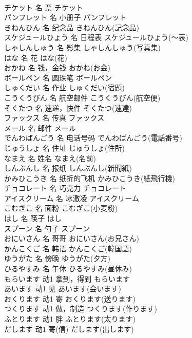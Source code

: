 \documentclass[8pt]{extreport}
\begin{document}
\begin{CJK}{UTF8}{min}
\\	チケット	名	票	チケット	
\\	パンフレット	名	小册子	パンフレット	
\\	きねんひん	名	纪念品	きねんひん(記念品)	
\\	スケジュールひょう	名	日程表	スケジュールひょう(～表)	
\\	しゃしんしゅう	名	影集	しゃしんしゅう(写真集)	
\\	はな	名	花	はな(花)	
\\	おかね	名	钱，金钱	おかね(お金)	
\\	ボールペン	名	圆珠笔	ボールペン	
\\	しゅくだい	名	作业	しゅくだい(宿題)	
\\	こうくうびん	名	航空邮件	こうくうびん(航空便)	
\\	そくたつ	名	速递，快件	そくたつ(速達)	
\\	ファックス	名	传真	ファックス	
\\	メール	名	邮件	メール	
\\	でんわばんごう	名	电话号码	でんわばんごう(電話番号)	
\\	じゅうしょ	名	住址	じゅうしょ(住所)	
\\	なまえ	名	姓名	なまえ(名前)	
\\	しんぶんし	名	报纸	しんぶんし(新聞紙)	
\\	かみひこうき	名	纸折的飞机	かみひこうき(紙飛行機)	
\\	チョコレート	名	巧克力	チョコレート	
\\	アイスクリーム	名	冰激凌	アイスクリーム	
\\	こむぎこ	名	面粉	こむぎこ(小麦粉)	
\\	はし	名	筷子	はし	
\\	スプーン	名	勺子	スプーン	
\\	おにいさん	名	哥哥	おにいさん(お兄さん)	
\\	かんこくご	名	韩语	かんこくご(韓国語)	
\\	ゆうがた	名	傍晚	ゆうがた(夕方)	
\\	ひるやすみ	名	午休	ひるやすみ(昼休み)	
\\	もらいます	动1	拿到，得到	もらいます	
\\	あいます	动1	见	あいます(会います)	
\\	おくります	动1	寄	おくります(送ります)	
\\	つくります	动1	做，制造	つくります(作ります)	
\\	ふとります	动1	胖	ふとります(太ります)	
\\	だします	动1	寄(信)	だします(出します)	

\end{CJK}
\end{document}
